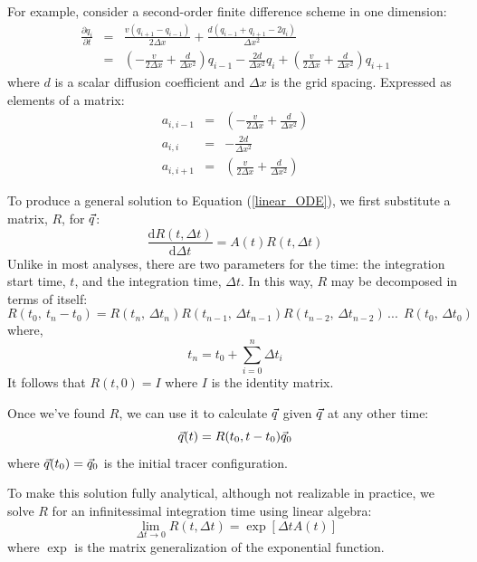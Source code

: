 \documentclass{article}
\begin{document}
For example, consider a second-order finite difference scheme in one dimension:
\begin{eqnarray}
\frac{\partial q_i}{\partial t} & = & \frac{v(q_{i+1} - q_{i-1})}{2 \Delta x} +
	\frac{d (q_{i-1} + q_{i+1} - 2 q_i)}{\Delta x^2} \\
& = & \left (- \frac{v}{2 \Delta x} + \frac{d}{\Delta x^2} \right ) q_{i-1} -
	\frac{2 d}{\Delta x^2} q_i + 
	\left (\frac{v}{2 \Delta x} + \frac{d}{\Delta x^2} \right ) q_{i+1} \label{finite_difference_diffusion}
\end{eqnarray}
where $d$ is a scalar diffusion coefficient and $\Delta x$ is the grid spacing.
Expressed as elements of a matrix:
\begin{eqnarray}
a_{i,i-1} & = & \left (- \frac{v}{2 \Delta x} + \frac{d}{\Delta x^2} \right ) \\
	a_{i,i} & = & -\frac{2 d}{\Delta x^2} \\
a_{i,i+1} & = & \left (\frac{v}{2 \Delta x} + \frac{d}{\Delta x^2} \right )
\end{eqnarray}

To produce a general solution to Equation (\ref{linear_ODE}), 
we first substitute a matrix, $R$, for $\vec q$:
\begin{equation}
	\frac{\mathrm d R(t, \Delta t)}{\mathrm d \Delta t} = A(t) R(t, \Delta t)
\end{equation}
Unlike in most analyses, there are two parameters for the time:
the integration start time, $t$, and the integration time, $\Delta t$.
In this way, $R$ may be decomposed in terms of itself:
\begin{equation}
	R(t_0,~t_n-t_0) = R(t_n, \, \Delta t_n) R(t_{n-1},\,\Delta t_{n-1}) R(t_{n-2},\,\Delta t_{n-2}) \, ...~~ 
	R(t_0,\,\Delta t_0)
\label{matrix_soln_decomposition}
\end{equation}
where,
\begin{equation}
t_n=t_0+\sum_{i=0}^{n} \Delta t_i
\end{equation}
It follows that $R(t, 0)=I$ where $I$ is the identity matrix.

Once we've found $R$, 
we can use it to calculate $\vec q$ given $\vec q$ at any other time:
\begin{equation}
	\vec q(t) = R(t_0, t-t_0) \vec q_0
	\label{tracer_integration}
\end{equation}
where $\vec q(t_0)=\vec q_0$ is the initial tracer configuration.

To make this solution fully analytical, although not realizable in practice,
we solve $R$ for an infinitessimal integration time using linear algebra:
\begin{equation}
	\lim_{\Delta t \rightarrow 0} R(t, \Delta t) = \exp \left [ \Delta t A(t) \right ]
\end{equation}
where $\exp$ is the matrix generalization of the exponential function.
\end{document}
